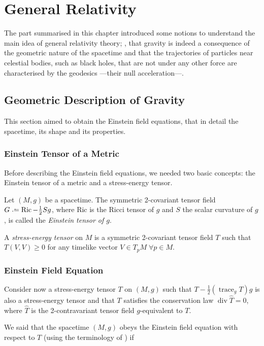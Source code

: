 \chapter{General Relativity}
\label{chapter:general-relativity}

The part summarised in this chapter introduced some notions to understand the main idea of general relativity theory; \ie, that gravity is indeed a consequence of the geometric nature of the spacetime and that the trajectories of particles near celestial bodies, such as black holes, that are not under any other force are characterised by the geodesics ---their null acceleration---.

\section{Geometric Description of Gravity}
\label{chapter:einstein}

This section aimed to obtain the Einstein field equations, that in detail the spacetime, its shape and its properties.

\subsection{Einstein Tensor of a Metric}

Before describing the Einstein field equations, we needed two basic concepts: the Einstein tensor of a metric and a stress-energy tensor.

Let $(M,g)$ be a spacetime. The symmetric 2-covariant tensor field $G \defeq \operatorname{Ric}-\frac{1}{2}Sg$, where Ric is the Ricci tensor of $g$ and $S$ the scalar curvature of $g$, is called the \emph{Einstein tensor of $g$}.

A \emph{stress-energy tensor} on $M$ is a symmetric 2-covariant tensor field $T$ such that $T(V,V) \geq 0$ for any timelike vector $V \in T_p M \; \forall p \in M$.

\subsection{Einstein Field Equation}

Consider now a stress-energy tensor $T$ on $(M,g)$ such that $T - \frac{1}{2}(\operatorname{trace}_g T) g$ is also a stress-energy tensor and that $T$ satisfies the conservation law $\operatorname{div} \widehat{T} = 0$, where $\widehat{T}$ is the 2-contravariant tensor field $g$-equivalent to $T$.

We said that the spacetime $(M,g)$ obeys the Einstein field equation with respect to $T$ (using the terminology of \cite[Sec. 6.2]{sachswu77}) if

